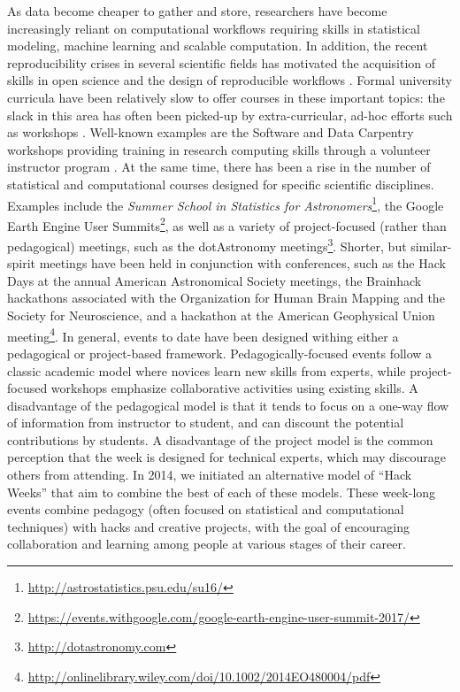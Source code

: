 \label{sec:introduction}
As data become cheaper to gather and store, researchers have become increasingly reliant on computational workflows requiring skills in statistical modeling, machine learning and scalable computation. In addition, the recent reproducibility crises in several scientific fields has motivated the acquisition of skills in open science and the design of reproducible workflows \cite[e.g.][]{pashler2012,frye2015,gezelter2015,baker2016}.
Formal university curricula have been relatively slow to offer courses in these important topics: the slack in this area has often been picked-up by extra-curricular, ad-hoc efforts such as workshops \cite{demasi2017}.
Well-known examples are the Software and Data Carpentry workshops providing training in research computing skills through a volunteer instructor program \cite{b:wilson-swc-lessons-2016,teal2015data}.
At the same time, there has been a rise in the number of statistical and computational courses designed for specific scientific disciplines.
Examples include the \textit{Summer School in Statistics for Astronomers}\footnote{\url{http://astrostatistics.psu.edu/su16/}}, the Google Earth Engine User Summits\footnote{\url{https://events.withgoogle.com/google-earth-engine-user-summit-2017/}}, as well as a variety of project-focused (rather than pedagogical) meetings, such as the dotAstronomy meetings\footnote{\url{http://dotastronomy.com}}.
Shorter, but similar-spirit meetings have been held in conjunction with conferences, such as the Hack Days at the annual American Astronomical Society meetings, the Brainhack hackathons associated with the Organization for Human Brain Mapping and the Society for Neuroscience\cite{Cameron_Craddock2016-wc}, and a hackathon at the American Geophysical Union meeting\footnote{\url{http://onlinelibrary.wiley.com/doi/10.1002/2014EO480004/pdf}}.
In general, events to date have been designed withing either a pedagogical or project-based framework.
Pedagogically-focused events follow a classic academic model where novices learn new skills from experts, while project-focused workshops emphasize collaborative activities using existing skills.
A disadvantage of the pedagogical model is that it tends to focus on a one-way flow of information from instructor to student, and can discount the potential contributions by students.
A disadvantage of the project model is the common perception that the week is designed for technical experts, which may discourage others from attending.
In 2014, we initiated an alternative model of ``Hack Weeks'' that aim to combine the best of each of these models.
These week-long events combine pedagogy (often focused on statistical and computational techniques) with hacks and creative projects, with the goal of encouraging collaboration and learning among people at various stages of their career.

